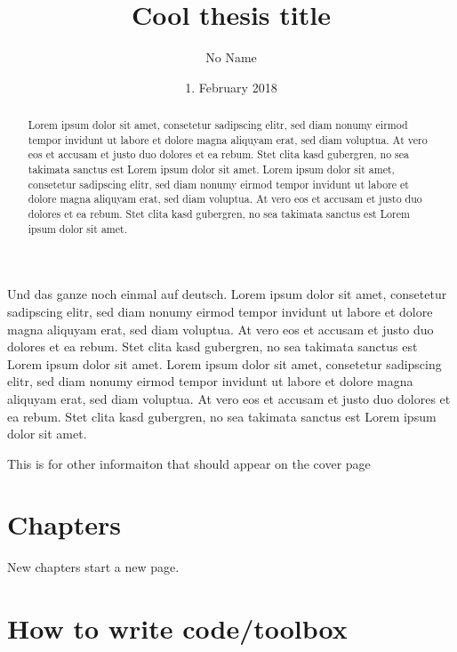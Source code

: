 \documentclass{mlthesis}
\author{No Name}
\title{Cool thesis title}
\date{1. February 2018}
\begin{document}
\maketitle
\begin{abstract}
  Lorem ipsum dolor sit amet, consetetur sadipscing elitr, sed diam
  nonumy eirmod tempor invidunt ut labore et dolore magna aliquyam
  erat, sed diam voluptua. At vero eos et accusam et justo duo dolores
  et ea rebum. Stet clita kasd gubergren, no sea takimata sanctus est
  Lorem ipsum dolor sit amet. Lorem ipsum dolor sit amet, consetetur
  sadipscing elitr, sed diam nonumy eirmod tempor invidunt ut labore et
  dolore magna aliquyam erat, sed diam voluptua. At vero eos et accusam
  et justo duo dolores et ea rebum. Stet clita kasd gubergren, no sea
  takimata sanctus est Lorem ipsum dolor sit amet.
\end{abstract}

\begin{zusammenfassung}
  Und das ganze noch einmal auf deutsch.    Lorem ipsum dolor sit amet, consetetur sadipscing elitr, sed diam
  nonumy eirmod tempor invidunt ut labore et dolore magna aliquyam
  erat, sed diam voluptua. At vero eos et accusam et justo duo dolores
  et ea rebum. Stet clita kasd gubergren, no sea takimata sanctus est
  Lorem ipsum dolor sit amet. Lorem ipsum dolor sit amet, consetetur
  sadipscing elitr, sed diam nonumy eirmod tempor invidunt ut labore et
  dolore magna aliquyam erat, sed diam voluptua. At vero eos et accusam
  et justo duo dolores et ea rebum. Stet clita kasd gubergren, no sea
  takimata sanctus est Lorem ipsum dolor sit amet.
\end{zusammenfassung}

\begin{note}
  This is for other informaiton that should appear on the cover page
\end{note}

\newpage

\chapter{Chapters}

New chapters start a new page.

\chapter{How to write code/toolbox}
\end{document}
